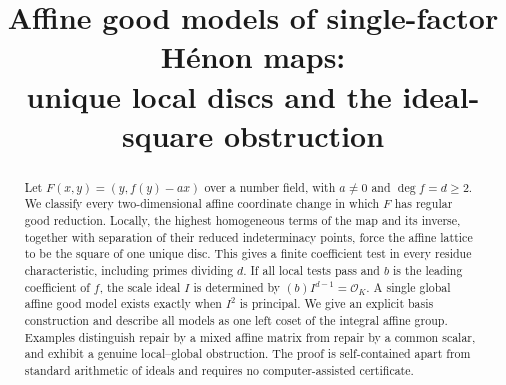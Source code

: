 \documentclass[11pt]{article}
\title{Affine good models of single-factor H\'enon maps:\\
unique local discs and the ideal-square obstruction}
\author{}
\date{}
\theoremstyle{definition}
\newcommand{\OO}{\mathcal O}
\numberwithin{equation}{section}
\begin{document}
\maketitle
\begin{abstract}
Let $F(x,y)=(y,f(y)-ax)$ over a number field, with $a\ne0$ and
$\deg f=d\ge2$. We classify every two-dimensional affine coordinate
change in which $F$ has regular good reduction. Locally, the highest
homogeneous terms of the map and its inverse, together with separation
of their reduced indeterminacy points, force the affine lattice to be
the square of one unique disc. This gives a finite coefficient test in
every residue characteristic, including primes dividing $d$. If all
local tests pass and $b$ is the leading coefficient of $f$, the scale
ideal $I$ is determined by $(b)I^{d-1}=\OO_K$. A single global affine
good model exists exactly when $I^2$ is principal. We give an explicit
basis construction and describe all models as one left coset of the
integral affine group. Examples distinguish repair by a mixed affine
matrix from repair by a common scalar, and exhibit a genuine
local--global obstruction. The proof is self-contained apart from
standard arithmetic of ideals and requires no computer-assisted certificate.
\end{abstract}









\end{document}
